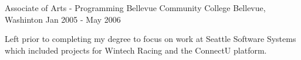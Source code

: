 

\begin{cventries}

  \cventry
      {Associate of Arts - Programming} %
      {Bellevue Community College} %
      {Bellevue, Washinton} %
      {Jan 2005 - May 2006} %
      {
        \begin{cvitems} %
        \item {Left prior to completing my degree to focus on work at Seattle Software Systems which included projects for Wintech Racing and the ConnectU platform.}
        \end{cvitems}
      }

      \end{cventries}
